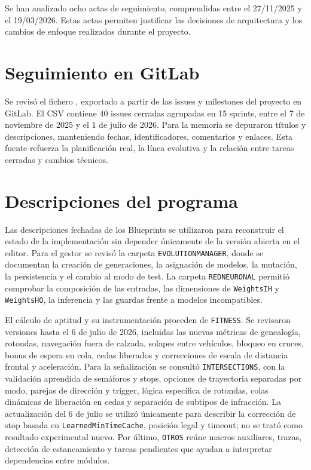 Se han analizado ocho actas de seguimiento, comprendidas entre el 27/11/2025 y el 19/03/2026. Estas actas permiten justificar las decisiones de arquitectura y los cambios de enfoque realizados durante el proyecto.

\section{Seguimiento en GitLab}

Se revisó el fichero , exportado a partir de las issues y milestones del proyecto en GitLab. El CSV contiene 40 issues cerradas agrupadas en 15 sprints, entre el 7 de noviembre de 2025 y el 1 de julio de 2026. Para la memoria se depuraron títulos y descripciones, manteniendo fechas, identificadores, comentarios y enlaces. Esta fuente refuerza la planificación real, la línea evolutiva y la relación entre tareas cerradas y cambios técnicos.

\section{Descripciones del programa}

Las descripciones fechadas de los Blueprints se utilizaron para reconstruir el estado de la implementación sin depender únicamente de la versión abierta en el editor. Para el gestor se revisó la carpeta \texttt{EVOLUTIONMANAGER}, donde se documentan la creación de generaciones, la asignación de modelos, la mutación, la persistencia y el cambio al modo de test. La carpeta \texttt{REDNEURONAL} permitió comprobar la composición de las entradas, las dimensiones de \texttt{WeightsIH} y \texttt{WeightsHO}, la inferencia y las guardas frente a modelos incompatibles.

El cálculo de aptitud y su instrumentación proceden de \texttt{FITNESS}. Se revisaron versiones hasta el 6 de julio de 2026, incluidas las nuevas métricas de genealogía, rotondas, navegación fuera de calzada, solapes entre vehículos, bloqueo en cruces, bonus de espera en cola, cedas liberados y correcciones de escala de distancia frontal y aceleración. Para la señalización se consultó \texttt{INTERSECTIONS}, con la validación aprendida de semáforos y stops, opciones de trayectoria separadas por modo, parejas de dirección y trigger, lógica específica de rotondas, colas dinámicas de liberación en cedas y separación de subtipos de infracción. La actualización del 6 de julio se utilizó únicamente para describir la corrección de stop basada en \texttt{LearnedMinTimeCache}, posición legal y timeout; no se trató como resultado experimental nuevo. Por último, \texttt{OTROS} reúne macros auxiliares, trazas, detección de estancamiento y tareas pendientes que ayudan a interpretar dependencias entre módulos.

